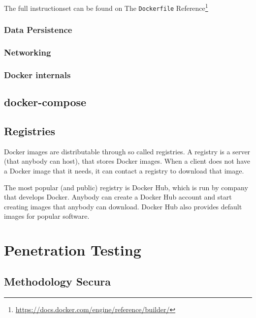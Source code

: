 The full instructionset can be found on The \lstinline{Dockerfile} Reference\footnote{\url{https://docs.docker.com/engine/reference/builder/}}

\subsubsection{Data Persistence}

\subsubsection{Networking}

\subsubsection{Docker internals}


\subsection{docker-compose}

\subsection{Registries}

Docker images are distributable through so called registries. A registry is a server (that anybody can host), that stores Docker images. When a client does not have a Docker image that it needs, it can contact a registry to download that image.

\hfill

The most popular (and public) registry is Docker Hub, which is run by company that develops Docker.
Anybody can create a Docker Hub account and start creating images that anybody can download. Docker Hub also provides default images for popular software.


\section{Penetration Testing}
\subsection{Methodology Secura}

